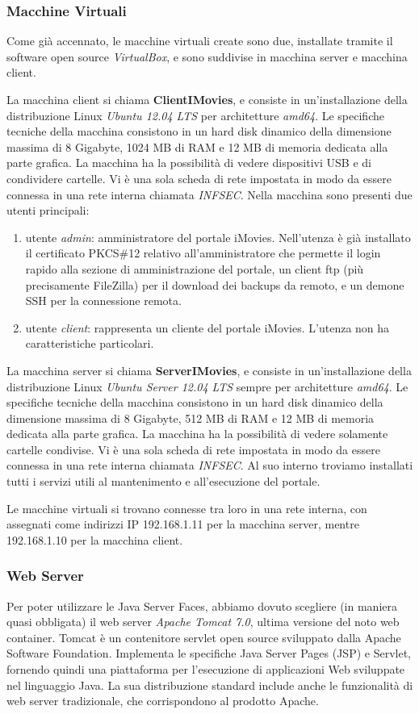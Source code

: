 \documentclass{article}
\begin{document}
\subsubsection*{Macchine Virtuali}
Come già accennato, le macchine virtuali create sono due,  installate tramite il software open source \emph{VirtualBox}, e sono suddivise in macchina server e macchina client.
\par La macchina client si chiama \textbf{ClientIMovies}, e consiste in un'installazione della distribuzione Linux \emph{Ubuntu 12.04 LTS} per architetture \emph{amd64}. Le specifiche tecniche della macchina consistono in un hard disk dinamico della dimensione massima di 8 Gigabyte, 1024 MB di RAM e 12 MB di memoria dedicata alla parte grafica. La macchina ha la possibilità di vedere dispositivi USB e di condividere cartelle. Vi è una sola scheda di rete impostata in modo da essere connessa in una rete interna chiamata \emph{INFSEC}. Nella macchina sono presenti due utenti principali:
\begin{enumerate}
\item utente \emph{admin}: amministratore del portale iMovies. Nell'utenza è già installato il certificato PKCS\#12 relativo all'amministratore che permette il login rapido alla sezione di amministrazione del portale, un client ftp (più precisamente FileZilla) per il download dei backups da remoto, e un demone SSH per la connessione remota. 
\item utente \emph{client}: rappresenta un cliente del portale iMovies. L'utenza non ha caratteristiche particolari.
\end{enumerate} 
\par La macchina server si chiama \textbf{ServerIMovies}, e consiste in un'installazione della distribuzione Linux \emph{Ubuntu Server 12.04 LTS} sempre per architetture \emph{amd64}. Le specifiche tecniche della macchina consistono in un hard disk dinamico della dimensione massima di 8 Gigabyte, 512 MB di RAM e 12 MB di memoria dedicata alla parte grafica. La macchina ha la possibilità di vedere solamente cartelle condivise. Vi è una sola scheda di rete impostata in modo da essere connessa in una rete interna chiamata \emph{INFSEC}.
Al suo interno troviamo installati tutti i servizi utili al mantenimento e all'esecuzione del portale.
\par Le macchine virtuali si trovano connesse tra loro in una rete interna, con assegnati come indirizzi IP 192.168.1.11 per la macchina server, mentre 192.168.1.10 per la macchina client.
\subsubsection*{Web Server}
Per poter utilizzare le Java Server Faces, abbiamo dovuto scegliere (in maniera quasi obbligata) il web server \emph{Apache Tomcat 7.0}, ultima versione del noto web container.
Tomcat è un contenitore servlet open source sviluppato dalla Apache Software Foundation. Implementa le specifiche Java Server Pages (JSP) e Servlet, fornendo quindi una piattaforma per l'esecuzione di applicazioni Web sviluppate nel linguaggio Java. La sua distribuzione standard include anche le funzionalità di web server tradizionale, che corrispondono al prodotto Apache.
\end{document}
